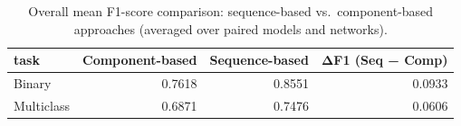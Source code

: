 \begin{table}
\caption{Overall mean F1-score comparison: sequence-based vs.\ component-based approaches (averaged over paired models and networks).}
\label{tab:q1_overall}
\begin{tabular}{lrrr}
\toprule
task & Component-based & Sequence-based & ΔF1 (Seq − Comp) \\
\midrule
Binary & 0.7618 & 0.8551 & 0.0933 \\
Multiclass & 0.6871 & 0.7476 & 0.0606 \\
\bottomrule
\end{tabular}
\end{table}
